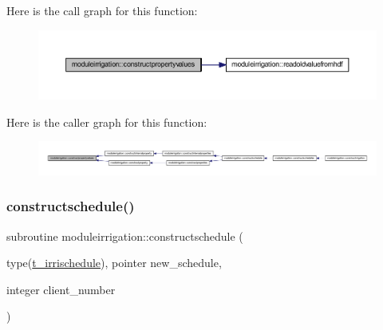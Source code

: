 Here is the call graph for this function\+:\nopagebreak
\begin{figure}[H]
\begin{center}
\leavevmode
\includegraphics[width=350pt]{namespacemoduleirrigation_afc426b9dbadbb0d592b750d75f2bedfc_cgraph}
\end{center}
\end{figure}
Here is the caller graph for this function\+:\nopagebreak
\begin{figure}[H]
\begin{center}
\leavevmode
\includegraphics[width=350pt]{namespacemoduleirrigation_afc426b9dbadbb0d592b750d75f2bedfc_icgraph}
\end{center}
\end{figure}
\mbox{\label{namespacemoduleirrigation_a46de92ffaac8fbd782bdcdf682a48601}} 
\subsubsection{\texorpdfstring{constructschedule()}{constructschedule()}}
{\footnotesize\ttfamily subroutine moduleirrigation\+::constructschedule (\begin{DoxyParamCaption}\item[{type(\mbox{\hyperlink{structmoduleirrigation_1_1t__irrischedule}{t\+\_\+irrischedule}}), pointer}]{new\+\_\+schedule,  }\item[{integer}]{client\+\_\+number }\end{DoxyParamCaption})\hspace{0.3cm}{\ttfamily [private]}}

